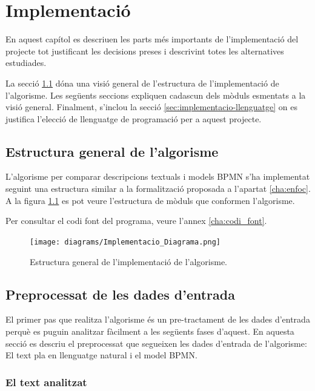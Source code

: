 \chapter{Implementació}
\label{sec:implementacio}

En aquest capítol es descriuen les parts més importants de l'implementació del projecte tot justificant les decisions preses i descrivint totes les alternatives estudiades. 

La secció \ref{sec:implementacio-overall} dóna una visió general de l'estructura de l'implementació de l'algorisme. Les següents seccions expliquen cadascun dels mòduls esmentats a la visió general. Finalment, s'inclou la secció \ref{sec:implementacio-llenguatge} on es justifica l'elecció de llenguatge de programació per a aquest projecte.

\section{Estructura general de l'algorisme}
\label{sec:implementacio-overall}

L'algorisme per comparar descripcions textuals i models BPMN s'ha implementat seguint una estructura similar a la formalització proposada a l'apartat \ref{cha:enfoc}. A la figura \ref{fig:implementacio-diagram} es pot veure l'estructura de mòduls que conformen l'algorisme.

Per consultar el codi font del programa, veure l'annex \ref{cha:codi_font}.

\begin{figure}[!h]
    \texttt{[image: diagrams/Implementacio\_Diagrama.png]}
    \caption{Estructura general de l'implementació de l'algorisme.}
    \label{fig:implementacio-diagram}
\end{figure}

\section{Preprocessat de les dades d'entrada}
\label{sec:implementacio-preprocessat}

El primer pas que realitza l'algorisme és un pre-tractament de les dades d'entrada perquè es puguin analitzar fàcilment a les següents fases d'aquest. En aquesta secció es descriu el preprocessat que segueixen les dades d'entrada de l'algorisme: El text pla en llenguatge natural i el model BPMN.

\subsection{El text analitzat}
\label{sec:implementacio-preprocessat-text}

